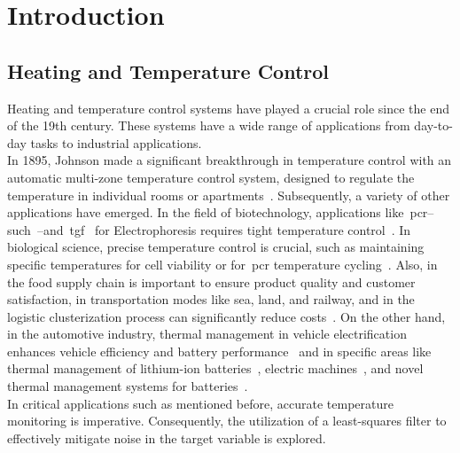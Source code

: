 \section{Introduction}

\subsection{Heating and Temperature Control}
Heating and temperature control systems have played a crucial role since the end of the 19th century. These systems have a wide range of applications from day-to-day tasks to industrial applications. \\

In 1895, Johnson made a significant breakthrough in temperature control with an automatic multi-zone temperature control system, designed to regulate the temperature in individual rooms or apartments~\cite{us542733s}. Subsequently, a variety of other applications have emerged. In the field of biotechnology, applications like~\acrfull{pcr}--such~\cite{MULLIS1987335, saiki1988, Bartlett2003, C6LC00984K, maltezos2010, mcknight2000, B208405H, hua2010multiplexed, mahjoob2008rapid, dinca2009fast, lien2009microfluidic, qiu2010large, hsieh2008enhancement, shen2005microchip, wang2009miniaturized}--and~\acrfull{tgf}~\cite{matsui2007temperature, ross2002microfluidic} for Electrophoresis requires tight temperature control~\cite{diagnostics3010033}. In biological science, precise temperature control is crucial, such as maintaining specific temperatures for cell viability or for~\acrshort{pcr} temperature cycling~\cite{diagnostics3010033, hung2005microfluid}. Also, in the food supply chain is important to ensure product quality and customer satisfaction, in transportation modes like sea, land, and railway, and in the logistic clusterization process can significantly reduce costs~\cite{baskutis2015temp}. On the other hand, in the automotive industry, thermal management in vehicle electrification enhances vehicle efficiency and battery performance~\cite{casals2016sustainability, previati2022thermal} and in specific areas like thermal management of lithium-ion batteries~\cite{karimi2013thermal}, electric machines~\cite{yang2017thermal}, and novel thermal management systems for batteries~\cite{al2018review}. \\

In critical applications such as mentioned before, accurate temperature monitoring is imperative. Consequently, the utilization of a least-squares filter to effectively mitigate noise in the target variable is explored.


